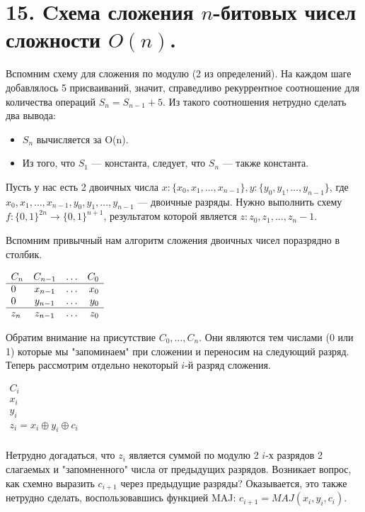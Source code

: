 \documentclass[a4paper, 12pt]{article}
\begin{document}
\section*{15. Cхема сложения $n$-битовых чисел сложности $O(n)$.}

Вспомним схему для сложения по модулю (2 из определений). На каждом шаге добавлялось 5 присваиваний, значит, справедливо рекуррентное соотношение для количества операций $S_n = S_{n-1} + 5$. Из такого соотношения нетрудно сделать два вывода:
\begin{itemize}
    \item $S_n$ вычисляется за O(n).
    \item Из того, что $S_1$ --- константа, следует, что $S_n$ --- также константа.
\end{itemize}

Пусть у нас есть 2 двоичных числа $x : \{x_0, x_1, \ldots, x_{n-1}\}, y : \{y_0, y_1, \ldots, y_{n-1}\}$, где $x_0, x_1, \ldots, x_{n-1}, y_0, y_1, \ldots, y_{n-1}$ --- двоичные разряды. Нужно выполнить схему $f: \{0,1\}^{2n} \rightarrow \{0,1\}^{n+1}$, результатом которой является $z : {z_0, z_1, \ldots, z_n-1}$.

Вспомним привычный нам алгоритм сложения двоичных чисел поразрядно в столбик.

$\begin{array}{l c c r}
 C_n & C_{n-1} & \ldots & C_0 \\
 \hline 0 & x_{n-1} & \ldots & x_0 \\
        0 & y_{n-1} & \ldots & y_0 \\
 \hline z_n & z_{n-1} & \ldots & z_0 \\
\end{array}$

Обратим внимание на присутствие $C_0, \ldots, C_n$. Они являются тем числами (0 или 1) которые мы "запоминаем" при сложении и переносим на следующий разряд. Теперь рассмотрим отдельно некоторый $i$-й разряд сложения.

$\begin{array}{l}
 C_i \\
 \hline x_i \\
        y_i \\
 \hline z_i = x_i \oplus y_i \oplus c_i \\
\end{array}$

Нетрудно догадаться, что $z_i$ является суммой по модулю 2 $i$-х разрядов 2 слагаемых и "запомненного" числа от предыдущих разрядов. Возникает вопрос, как схемно выразить $c_{i+1}$ через предыдущие разряды? Оказывается, это также нетрудно сделать, воспользовавшись функцией MAJ: $c_{i+1} = MAJ(x_i, y_i, c_i)$.
\end{document}
